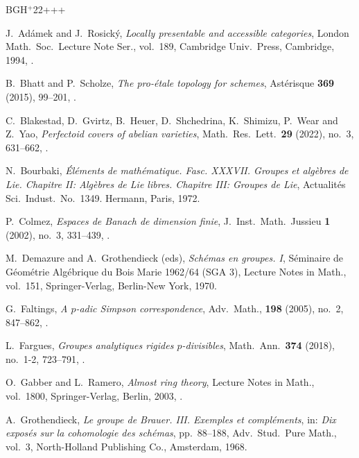 \newcommand{\etalchar}[1]{$^{#1}$}
\begin{thebibliography}{BGH{\etalchar{+}}22+++}
	
J.~Ad\'{a}mek and  J.~Rosick\'{y}, 
{\em Locally presentable and accessible categories}, London Math.\ Soc.\ Lecture Note Ser., vol.~189, Cambridge Univ.\ Press, Cambridge, 1994, .

B.~Bhatt and  P.~Scholze, 
{\em {T}he pro-\'{e}tale topology for schemes}, Ast\'{e}risque \textbf{369} (2015), 99--201, .
        
\bibitem[BGH{\etalchar{+}}22]{perfectoid-covers-Arizona}
C.~Blakestad, D.~Gvirtz, B.~Heuer, D.~Shchedrina, K.~Shimizu, P.~Wear and  Z.~Yao, 
{\em {P}erfectoid covers of abelian varieties}, Math.\ Res.\ Lett.\ \textbf{29} (2022), no.~3, 
631--662,  .
	
N.~Bourbaki, 
{\em \'{E}l\'{e}ments de math\'{e}matique. {F}asc. {XXXVII}.  {G}roupes et alg\`ebres de {L}ie. {C}hapitre {II}: {A}lg\`ebres de {L}ie libres. {C}hapitre {III}: {G}roupes de {L}ie}, Actualit\'{e}s Sci.\ Indust.\, No.~1349. Hermann, Paris, 1972.
	

P.~Colmez, 
{\em {E}spaces de {B}anach de dimension finie}, J.~Inst.\ Math.\ Jussieu \textbf{1} (2002), no.~3, 331--439, .

M.~Demazure and A.~Grothendieck (eds), \emph{Sch\'emas en groupes. I}, S\'eminaire de G\'eom\'etrie Alg\'ebrique du Bois Marie 1962/64 (SGA 3), Lecture Notes in Math., vol.~151, Springer-Verlag, Berlin-New York, 1970.

G.~Faltings, 
{\em {A} {$p$}-adic {S}impson correspondence}, Adv.\ Math., \textbf{198} (2005), no.~2, 847--862, .
	
L.~Fargues, 
{\em {G}roupes analytiques rigides {$p$}-divisibles}, Math.\ Ann.\ \textbf{374} (2018), no.~1-2, 723--791, .
	
O.~Gabber and L.~Ramero, 
{\em {A}lmost ring theory},  Lecture Notes in Math., vol.~1800, Springer-Verlag, Berlin, 2003, .
	
A.~Grothendieck, 
{\em Le groupe de {B}rauer. {III}. {E}xemples et compl\'{e}ments}, in: {\em Dix expos\'{e}s sur la cohomologie des sch\'{e}mas}, pp.~88--188, Adv.\ Stud.\ Pure Math., vol.~3, North-Holland Publishing Co., Amsterdam, 1968.


\end{thebibliography}
